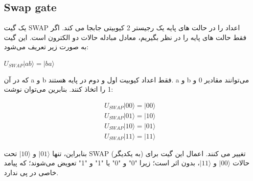 \documentclass{book}
\begin{document}
 
 
\subsection{Swap gate}
یک گیت SWAP اعداد را در حالت های پایه یک رجیستر 2 کیوبیتی جابجا می کند. اگر فقط حالت های پایه را در نظر بگیریم، معادل مبادله حالات دو الکترون است. این گیت به صورت  زیر تعریف می‌شود:
\begin{center}
	$U_{SWAP}   \vert ab\rangle = \vert ba \rangle$
\end{center}
که در آن a و b فقط اعداد کیوبیت اول و دوم در پایه هستند. a و b می‌توانند مقادیر 0 و 1 را اتخاذ کنند. بنابرین می‌توان نوشت:
\begin{center}
	$$\begin{aligned}
		& U_{S W A P}|00\rangle=|00\rangle \\
		& U_{S W A P}|01\rangle=|10\rangle \\
		& U_{S W A P}|10\rangle=|01\rangle \\
		& U_{S W A P}|11\rangle=|11\rangle
	\end{aligned}$$
\end{center}




بنابراین، تنها $\vert 01 \rangle$ و $\vert 10 \rangle$ تحت SWAP (به یکدیگر) تغییر می کنند.
اعمال این گیت برای حالات $\vert 00 \rangle$ و $\vert 11 \rangle$، بدون اثر است؛ زیرا "0" و "0" یا "1" و "1" تعویض می‌شوند؛ که پیامد خاصی در پی ندارد.
\end{document}
